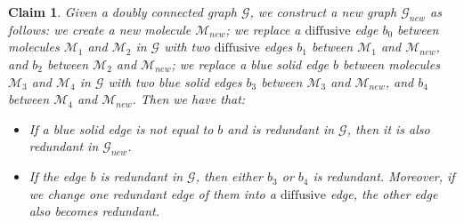 \documentclass{article}
\newcommand{\1}{\mathds{1}}
\numberwithin{equation}{section}
\renewcommand{\cal}{\mathcal}
\newcommand{\dashed}{\text{diffusive}}
\theoremstyle{plain} %
\newtheorem{claim}[theorem]{Claim}
\theoremstyle{remark}
\begin{document}
	
\begin{claim}\label{trivial_graph5}
Given a doubly connected graph $\cal G$, we construct a new graph $\cal G_{new}$ as follows: we create a new molecule $\cal M_{new}$; we replace a $\dashed$ edge $b_0$ between molecules $\cal M_1$ and $\cal M_2$ in $\cal G$ with two $\dashed$ edges $b_1$ between $\cal M_1$ and $\cal M_{new}$, and $b_2$ between $\cal M_2$ and $\cal M_{new}$; we replace a blue solid edge $b$ between molecules $\cal M_3$ and $\cal M_4$ in $\cal G$ with two blue solid edges $b_3$ between $\cal M_3$ and $\cal M_{new}$, and $b_4$ between $\cal M_4$ and $\cal M_{new}$. Then we have that:
\begin{itemize}
\item[(i)] If a blue solid edge is not equal to $b$ and is redundant in $\cal G$, then it is also redundant in $\cal G_{new}$. 
			
\item[(ii)] If the edge $b$ is redundant in $\cal G$, then either $b_3$ or $b_4$ is redundant. Moreover, if we change one redundant edge of them into a $\dashed$ edge, the other edge also becomes redundant. 
\end{itemize}
\end{claim}
\end{document}
